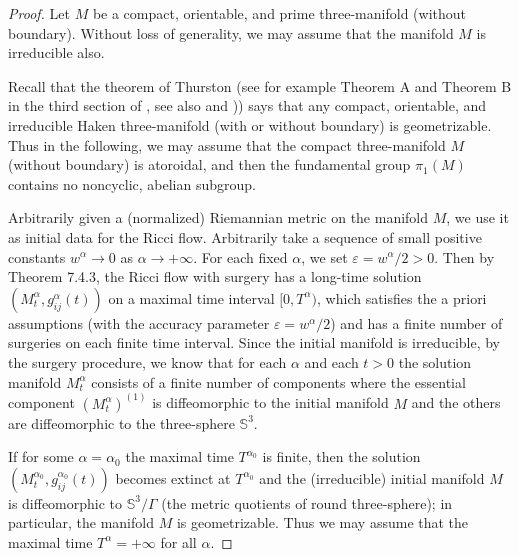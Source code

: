 \begin{proof}
Let $M$ be a compact, orientable, and prime three-manifold
(without boundary). Without loss of generality, we may assume that
the manifold $M$ is irreducible also.

Recall that the theorem of Thurston (see for example Theorem A and
Theorem B in the third section of \cite{Morgan}, see also
\cite{Mc} and \cite{Ot})) says that any compact, orientable, and
irreducible Haken three-manifold (with or without boundary) is
geometrizable. Thus in the following, we may assume that the
compact three-manifold $M$ (without boundary) is atoroidal, and
then the fundamental group $\pi_1(M)$ contains no noncyclic,
abelian subgroup.

Arbitrarily given a (normalized) Riemannian metric on the manifold
$M$, we use it as initial data for the Ricci flow. Arbitrarily
take a sequence of small positive constants $w^{\alpha}\rightarrow
0$ as $\alpha \rightarrow +\infty$. For each fixed $\alpha$, we
set $\varepsilon={w^{\alpha}}/{2}>0$. Then by Theorem 7.4.3, the
Ricci flow with surgery has a long-time solution
$(M^{\alpha}_t,g^{\alpha}_{ij}(t))$ on a maximal time interval
$[0,T^{\alpha})$, which satisfies the a priori assumptions (with
the accuracy parameter $\varepsilon={w^{\alpha}}/{2}$) and has a
finite number of surgeries on each finite time interval. Since the
initial manifold is irreducible, by the surgery procedure, we know
that for each $\alpha$ and each $t>0$ the solution manifold
$M^{\alpha}_t$ consists of a finite number of components where the
essential component $(M^{\alpha}_t)^{(1)}$ is diffeomorphic to the
initial manifold $M$ and the others are diffeomorphic to the
three-sphere $\mathbb{S}^3$.

If for some $\alpha=\alpha_0$ the maximal time $T^{\alpha_0}$ is
finite, then the solution $(M^{\alpha_0}_t,g^{\alpha_0}_{ij}(t))$
becomes extinct at $T^{\alpha_0}$ and the (irreducible) initial
manifold $M$ is diffeomorphic to $\mathbb{S}^3/\Gamma$ (the metric
quotients of round three-sphere); in particular, the manifold $M$
is geometrizable. Thus we may assume that the maximal time
$T^{\alpha} = +\infty$ for all $\alpha$.


\end{proof}
